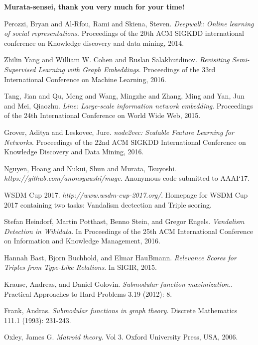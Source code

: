 \documentclass[12pt,twoside]{article}
\begin{document}
\textbf{Murata-sensei, thank you very much for your time!}

\medskip

\begin{thebibliography}{99}

Perozzi, Bryan and Al-Rfou, Rami and Skiena, Steven. \textit{Deepwalk: Online learning of social representations}. Proceedings of the 20th ACM SIGKDD international conference on Knowledge discovery and data mining, 2014.

Zhilin Yang and William W. Cohen and Ruslan Salakhutdinov. \textit{Revisiting Semi-Supervised Learning with Graph Embeddings}. Proceedings of the 33rd International Conference on Machine Learning, 2016.

Tang, Jian and Qu, Meng and Wang, Mingzhe and Zhang, Ming and Yan, Jun and Mei, Qiaozhu. \textit{Line: Large-scale information network embedding}. Proceedings of the 24th International Conference on World Wide Web, 2015.

Grover, Aditya and Leskovec, Jure. \textit{node2vec: Scalable Feature Learning for Networks}. Proceedings of the 22nd ACM SIGKDD International Conference on Knowledge Discovery and Data Mining, 2016.

Nguyen, Hoang and Nukui, Shun and Murata, Tsuyoshi. \textit{https://github.com/anonsyuushi/mage}. Anonymous code submitted to AAAI`17.

WSDM Cup 2017. \textit{http://www.wsdm-cup-2017.org/}. Homepage for WSDM Cup 2017 containing two tasks: Vandalism dectection and Triple scoring.

Stefan Heindorf, Martin Potthast, Benno Stein, and Gregor Engels. \textit{Vandalism Detection in Wikidata}. In Proceedings of the 25th ACM International Conference on Information and Knowledge Management, 2016.

Hannah Bast, Bjorn Buchhold, and Elmar HauBmann. \textit{Relevance Scores for Triples from Type-Like Relations}. In SIGIR, 2015.

Krause, Andreas, and Daniel Golovin. \textit{Submodular function maximization.}. Practical Approaches to Hard Problems 3.19 (2012): 8.

Frank, Andras. \textit{Submodular functions in graph theory}. Discrete Mathematics 111.1 (1993): 231-243.

Oxley, James G. \textit{Matroid theory}. Vol 3. Oxford University Press, USA, 2006.

\end{thebibliography}
\end{document}
